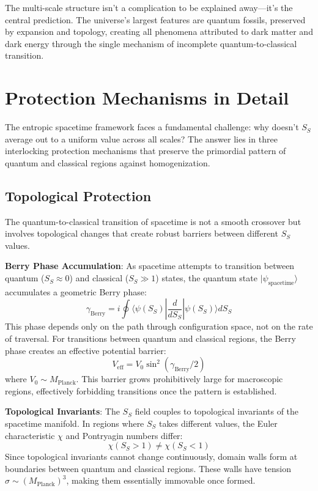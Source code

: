 \documentclass[12pt]{article}
\begin{document}
The multi-scale structure isn't a complication to be explained away---it's the central prediction. The universe's largest features are quantum fossils, preserved by expansion and topology, creating all phenomena attributed to dark matter and dark energy through the single mechanism of incomplete quantum-to-classical transition.

\section{Protection Mechanisms in Detail}

The entropic spacetime framework faces a fundamental challenge: why doesn't $S_S$ average out to a uniform value across all scales? The answer lies in three interlocking protection mechanisms that preserve the primordial pattern of quantum and classical regions against homogenization.

\subsection{Topological Protection}

The quantum-to-classical transition of spacetime is not a smooth crossover but involves topological changes that create robust barriers between different $S_S$ values.

\textbf{Berry Phase Accumulation}: As spacetime attempts to transition between quantum ($S_S \approx 0$) and classical ($S_S \gg 1$) states, the quantum state $|\psi_\mathrm{spacetime}\rangle$ accumulates a geometric Berry phase:
\begin{equation}
    \gamma_\mathrm{Berry} = i \oint \langle \psi(S_S)|\frac{d}{dS_S}|\psi(S_S)\rangle dS_S
\end{equation}
This phase depends only on the path through configuration space, not on the rate of traversal. For transitions between quantum and classical regions, the Berry phase creates an effective potential barrier:
\begin{equation}
    V_\mathrm{eff} = V_0 \sin^2(\gamma_\mathrm{Berry}/2)
\end{equation}
where $V_0 \sim M_\mathrm{Planck}$. This barrier grows prohibitively large for macroscopic regions, effectively forbidding transitions once the pattern is established.

\textbf{Topological Invariants}: The $S_S$ field couples to topological invariants of the spacetime manifold. In regions where $S_S$ takes different values, the Euler characteristic $\chi$ and Pontryagin numbers differ:
\begin{equation}
    \chi(S_S > 1) \neq \chi(S_S < 1)
\end{equation}
Since topological invariants cannot change continuously, domain walls form at boundaries between quantum and classical regions. These walls have tension $\sigma \sim (M_\mathrm{Planck})^3$, making them essentially immovable once formed.
\end{document}
